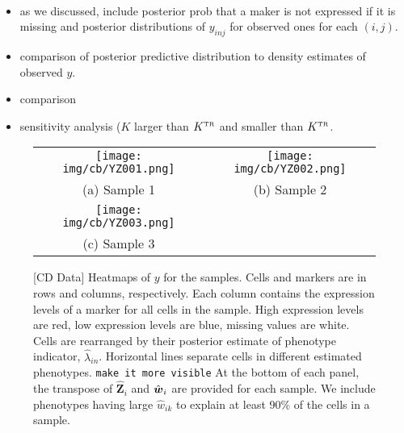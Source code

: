 \documentclass[12pt,]{article}
\def\Z{\bm{Z}}
\newcommand{\true}{{\mbox{\tiny TR}}}
\newcommand{\bw}{\mbox{\boldmath $w$}}
\begin{document}
{\tt 
\begin{itemize}
\item as we discussed, include posterior prob that a maker is not expressed if it is missing and posterior distributions of $y_{inj}$ for observed ones for each $(i,j)$.

\item comparison of posterior predictive distribution to density estimates of observed $y$.

\item comparison

\item sensitivity analysis ($K$ larger than $K^\true$ and smaller than $K^\true$.

\end{itemize}
}



\begin{figure}[ht!]
  \begin{center}
\begin{tabular}{cc}
\texttt{[image: img/cb/YZ001.png]}&
\texttt{[image: img/cb/YZ002.png]}\\
(a) Sample 1 & (b) Sample 2 \\
\texttt{[image: img/cb/YZ003.png]} &\\
(c) Sample 3 & \\
  \end{tabular}
 \end{center}
 \vspace{-0.05in}
\caption{[CD Data]  Heatmaps of $y$ for the samples. Cells and markers are in
rows and columns, respectively. Each column contains the expression levels of
a marker for all cells in the sample. High expression levels are red, low
expression levels are blue, missing values are white.   Cells are rearranged
by their posterior estimate of phenotype indicator, $\hat{\lambda}_{in}$.
Horizontal lines separate cells in different estimated phenotypes.
{\tt make it more visible}
%
At the bottom of each panel, the transpose of $\hat{\Z}_i$
and $\hat{\bw}_i$ are provided for each sample. We include phenotypes having
large $\hat{w}_{ik}$ to explain at least 90\% of the cells in a sample.}
\label{fig:cb-post-Z}
\end{figure}

\end{document}
